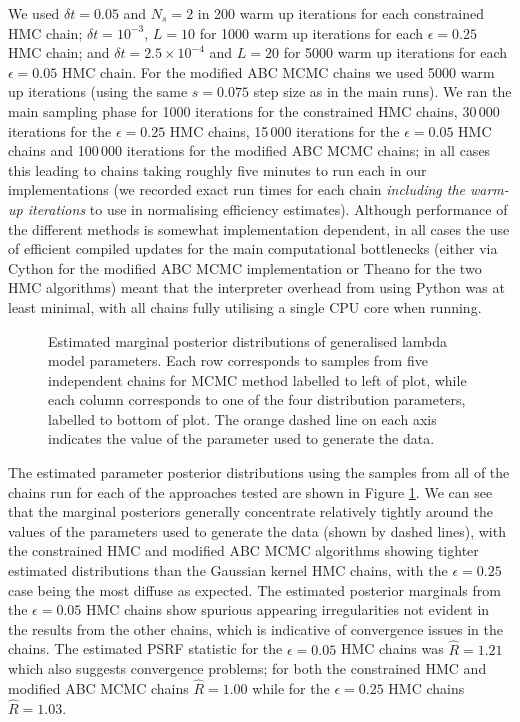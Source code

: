 We used $\delta t = 0.05$ and $N_s = 2$ in 200 warm up iterations for each constrained \ac{HMC} chain; $\delta t = 10^{-3}$, $L = 10$ for 1000 warm up iterations for each $\epsilon=0.25$ \ac{HMC} chain; and $\delta t = 2.5 \times 10^{-4}$ and $L = 20$ for 5000 warm up iterations for each $\epsilon = 0.05$ \ac{HMC} chain. For the modified \ac{ABC} \ac{MCMC} chains we used 5000 warm up iterations (using the same $s=0.075$ step size as in the main runs). We ran the main sampling phase for 1000 iterations for the constrained \ac{HMC} chains, 30\,000 iterations for the $\epsilon = 0.25$ \ac{HMC} chains, 15\,000 iterations for the $\epsilon=0.05$ \ac{HMC} chains and 100\,000 iterations for the modified \ac{ABC} \ac{MCMC} chains; in all cases this leading to chains taking roughly five minutes to run each in our implementations (we recorded exact run times for each chain \emph{including the warm-up iterations} to use in normalising efficiency estimates). Although performance of the different methods is somewhat implementation dependent, in all cases the use of efficient compiled updates for the main computational bottlenecks (either via Cython for the modified \ac{ABC} \ac{MCMC} implementation or Theano for the two \ac{HMC} algorithms) meant that the interpreter overhead from using Python was at least minimal, with all chains fully utilising a single \ac{CPU} core when running.

\begin{figure}
\centering
{}
\caption[Generalised $\lambda$ parameter posterior histograms.]{Estimated marginal posterior distributions of generalised lambda model parameters. Each row corresponds to samples from five independent chains for \ac{MCMC} method labelled to left of plot, while each column corresponds to one of the four distribution parameters, labelled to bottom of plot. The orange dashed line on each axis indicates the value of the parameter used to generate the data.}
\label{fig:generalised-lambda-param-posterior}
\end{figure}

The estimated parameter posterior distributions using the samples from all of the chains run for each of the approaches tested are shown in Figure \ref{fig:generalised-lambda-param-posterior}. We can see that the marginal posteriors generally concentrate relatively tightly around the values of the parameters used to generate the data (shown by dashed lines), with the constrained \ac{HMC} and modified \ac{ABC} \ac{MCMC} algorithms showing tighter estimated distributions than the Gaussian kernel \ac{HMC} chains, with the $\epsilon = 0.25$ case being the most diffuse as expected. The estimated posterior marginals from the $\epsilon = 0.05$ \ac{HMC} chains show spurious appearing irregularities not evident in the results from the other chains, which is indicative of convergence issues in the chains. The estimated \ac{PSRF} statistic for the $\epsilon = 0.05$ \ac{HMC} chains was $\hat{R} = 1.21$ which also suggests convergence problems; for both the constrained \ac{HMC} and modified \ac{ABC} \ac{MCMC} chains $\hat{R} = 1.00$ while for the $\epsilon = 0.25$ \ac{HMC} chains $\hat{R} = 1.03$.


